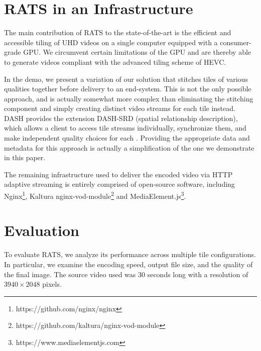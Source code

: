 \section{RATS in an Infrastructure} \label{infra}

The main contribution of RATS to the state-of-the-art is the efficient and accessible
tiling of UHD videos on a single computer equipped with a consumer-grade GPU. We circumvent certain limitations of the GPU and are thereby able to generate videos compliant with the advanced tiling scheme of HEVC.

In the demo, we present
a variation of our solution that stitches tiles of various
qualities together before delivery to an end-system.
This is not the only possible approach, and is actually somewhat more complex
than eliminating the stitching component and simply creating distinct video streams for each tile instead. 
DASH provides the extension DASH-SRD (spatial relationship description), which
allows a client to access tile streams individually, synchronize them, and make
independent quality choices for each \cite{niamut2016}. Providing the appropriate data and
metadata for this approach is actually a simplification of the one we
demonstrate in this paper.

The remaining infrastructure used to deliver the encoded video via HTTP adaptive streaming is entirely comprised of open-source software, including Nginx\footnote{https://github.com/nginx/nginx}, Kaltura nginx-vod-module\footnote{https://github.com/kaltura/nginx-vod-module} and MediaElement.js\footnote{https://www.mediaelementjs.com}.



\section{Evaluation} \label{eval}

To evaluate RATS, we analyze its performance across multiple tile configurations. In particular, we examine the encoding speed, output file size, and the quality of the final image. The source video used was 30 seconds long with a resolution of $3940\times2048$ pixels.

